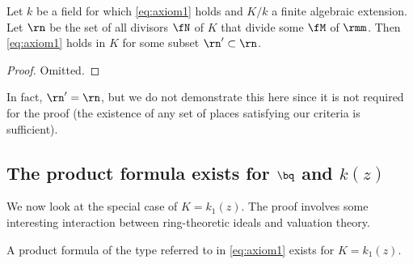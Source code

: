 \begin{lemma}
  Let $k$ be a field for which \ref{eq:axiom1} holds and $K/k$ a finite algebraic
  extension. Let $\rn$ be the set of all divisors $\fN$ of $K$ that divide some
  $\fM$ of $\rmm$. Then \ref{eq:axiom1} holds in $K$ for some subset $\rn' \subset \rn$.
\end{lemma}

\begin{proof}
  Omitted.
\end{proof}

In fact, $\rn' = \rn$, but we do not demonstrate this here since it is not
required for the proof (the existence of any set of places satisfying our
criteria is sufficient).

\subsection{The product formula exists for $\bq$ and $k(z)$}

We now look at the special case of $K = k_1(z)$. The proof involves some
interesting interaction between ring-theoretic ideals and valuation theory.

\begin{thm}
  A product formula of the type referred to in \ref{eq:axiom1} exists for
  $K=k_1(z)$.
\end{thm}

